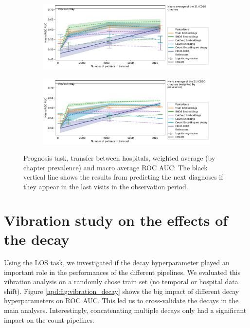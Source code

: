 \documentclass[french,12pt,twoside,a4paper]{book}
\begin{document}
\begin{appendices}
  \begin{figure}[h!]
    \centering
    \begin{subfigure}[b]{\linewidth}
      \includegraphics[width=\linewidth]{img/chapter_3/hospital_split_prognosis_roc_auc_score__c_macro.pdf}
      \caption{}%
      \label{apd:fig:hospital_split_prognosis_roc_auc_macro}
    \end{subfigure}
    \vfill
    \begin{subfigure}[b]{\linewidth}
      \includegraphics[width=\linewidth]{img/chapter_3/hospital_split_prognosis_roc_auc_score__c_micro.pdf}
      \caption{}%
      \label{apd:fig:hospital_split_prognosis_roc_auc_weighted}
    \end{subfigure}
    \caption{Prognosis task, transfer between hospitals, weighted average (by chapter
      prevalence) and macro average ROC AUC: The black vertical line shows the
      results from predicting the next diagnoses if they appear in the last visits
      in the observation period.}%
    \label{apd:fig:hospital_split_prognosis_roc_auc}
  \end{figure}

  \section{Vibration study on the effects of the decay}
  \label{apd:vibration_study_decay}

  Using the LOS task, we investigated if the decay hyperparameter played an
  important role in the performances of the different pipelines. We evaluated this
  vibration analysis on a randomly chose train set (no temporal or hospital data
  shift). Figure \ref{apd:fig:vibration_decay} shows the big impact of different
  decay hyperparameters on ROC AUC. This led us to cross-validate the decays in
  the main analyses. Interestingly, concatenating multiple decays only had a
  significant impact on the count pipelines.


\end{appendices}
\end{document}
